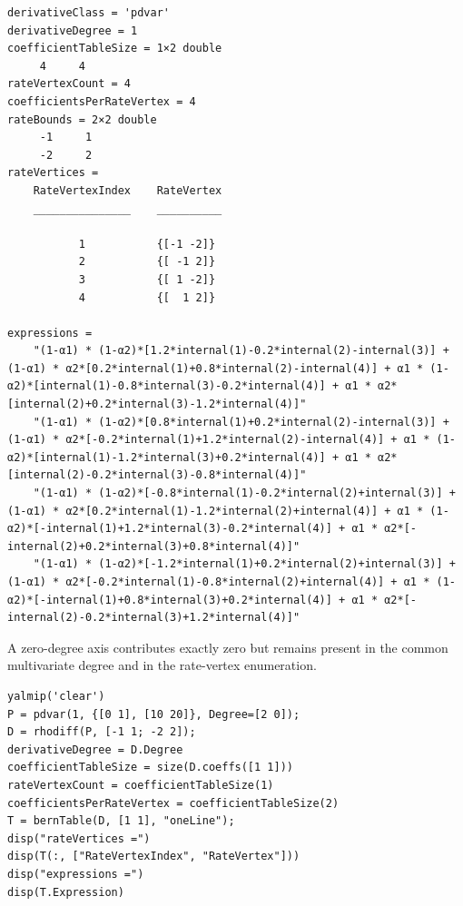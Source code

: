 \begin{lstlisting}[style=dpwideoutput]
derivativeClass = 'pdvar'
derivativeDegree = 1
coefficientTableSize = 1×2 double
     4     4
rateVertexCount = 4
coefficientsPerRateVertex = 4
rateBounds = 2×2 double
     -1     1
     -2     2
rateVertices =
    RateVertexIndex    RateVertex
    _______________    __________

           1           {[-1 -2]}
           2           {[ -1 2]}
           3           {[ 1 -2]}
           4           {[  1 2]}

expressions =
    "(1-α1) * (1-α2)*[1.2*internal(1)-0.2*internal(2)-internal(3)] + (1-α1) * α2*[0.2*internal(1)+0.8*internal(2)-internal(4)] + α1 * (1-α2)*[internal(1)-0.8*internal(3)-0.2*internal(4)] + α1 * α2*[internal(2)+0.2*internal(3)-1.2*internal(4)]"
    "(1-α1) * (1-α2)*[0.8*internal(1)+0.2*internal(2)-internal(3)] + (1-α1) * α2*[-0.2*internal(1)+1.2*internal(2)-internal(4)] + α1 * (1-α2)*[internal(1)-1.2*internal(3)+0.2*internal(4)] + α1 * α2*[internal(2)-0.2*internal(3)-0.8*internal(4)]"
    "(1-α1) * (1-α2)*[-0.8*internal(1)-0.2*internal(2)+internal(3)] + (1-α1) * α2*[0.2*internal(1)-1.2*internal(2)+internal(4)] + α1 * (1-α2)*[-internal(1)+1.2*internal(3)-0.2*internal(4)] + α1 * α2*[-internal(2)+0.2*internal(3)+0.8*internal(4)]"
    "(1-α1) * (1-α2)*[-1.2*internal(1)+0.2*internal(2)+internal(3)] + (1-α1) * α2*[-0.2*internal(1)-0.8*internal(2)+internal(4)] + α1 * (1-α2)*[-internal(1)+0.8*internal(3)+0.2*internal(4)] + α1 * α2*[-internal(2)-0.2*internal(3)+1.2*internal(4)]"
\end{lstlisting}

A zero-degree axis contributes exactly zero but remains present in the common multivariate degree and in the rate-vertex enumeration.

\begin{lstlisting}[style=dpmatlab]
yalmip('clear')
P = pdvar(1, {[0 1], [10 20]}, Degree=[2 0]);
D = rhodiff(P, [-1 1; -2 2]);
derivativeDegree = D.Degree
coefficientTableSize = size(D.coeffs([1 1]))
rateVertexCount = coefficientTableSize(1)
coefficientsPerRateVertex = coefficientTableSize(2)
T = bernTable(D, [1 1], "oneLine");
disp("rateVertices =")
disp(T(:, ["RateVertexIndex", "RateVertex"]))
disp("expressions =")
disp(T.Expression)
\end{lstlisting}

